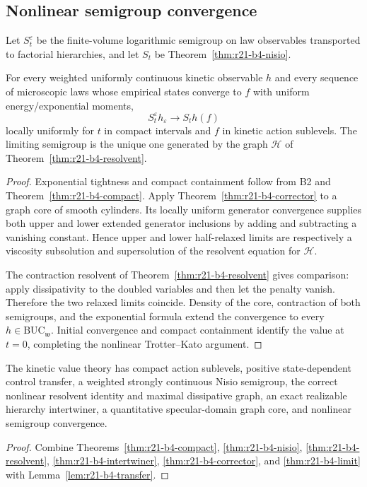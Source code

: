 \subsection{Nonlinear semigroup convergence}

Let $S_t^\varepsilon$ be the finite-volume logarithmic semigroup on law
observables transported to factorial hierarchies, and let $S_t$ be
Theorem~\ref{thm:r21-b4-nisio}.

\begin{theorem}
\label{thm:r21-b4-limit}
For every weighted uniformly continuous kinetic observable $h$ and every
sequence of microscopic laws whose empirical states converge to $f$ with
uniform energy/exponential moments,
\[
 S_t^\varepsilon h_\varepsilon\longrightarrow S_th(f)
\]
locally uniformly for $t$ in compact intervals and $f$ in kinetic action
sublevels.  The limiting semigroup is the unique one generated by the graph
$\mathcal H$ of Theorem~\ref{thm:r21-b4-resolvent}.
\end{theorem}

\begin{proof}
Exponential tightness and compact containment follow from B2 and
Theorem~\ref{thm:r21-b4-compact}.  Apply
Theorem~\ref{thm:r21-b4-corrector} to a graph core of smooth cylinders.  Its
locally uniform generator convergence supplies both upper and lower extended
generator inclusions by adding and subtracting a vanishing constant.  Hence
upper and lower half-relaxed limits are respectively a viscosity subsolution
and supersolution of the resolvent equation for $\mathcal H$.

The contraction resolvent of Theorem~\ref{thm:r21-b4-resolvent} gives
comparison: apply dissipativity to the doubled variables and then let the
penalty vanish.  Therefore the two relaxed limits coincide.  Density of the
core, contraction of both semigroups, and the exponential formula extend the
convergence to every $h\in\mathrm{BUC}_{\mathfrak w}$.  Initial convergence and
compact containment identify the value at $t=0$, completing the nonlinear
Trotter--Kato argument.
\end{proof}

\begin{theorem}
\label{thm:r21-b4-main}
The kinetic value theory has compact action sublevels, positive
state-dependent control transfer, a weighted strongly continuous Nisio
semigroup, the correct nonlinear resolvent identity and maximal dissipative
graph, an exact realizable hierarchy intertwiner, a quantitative
specular-domain graph core, and nonlinear semigroup convergence.
\end{theorem}

\begin{proof}
Combine Theorems~\ref{thm:r21-b4-compact},
\ref{thm:r21-b4-nisio}, \ref{thm:r21-b4-resolvent},
\ref{thm:r21-b4-intertwiner}, \ref{thm:r21-b4-corrector}, and
\ref{thm:r21-b4-limit} with Lemma~\ref{lem:r21-b4-transfer}.
\end{proof}
